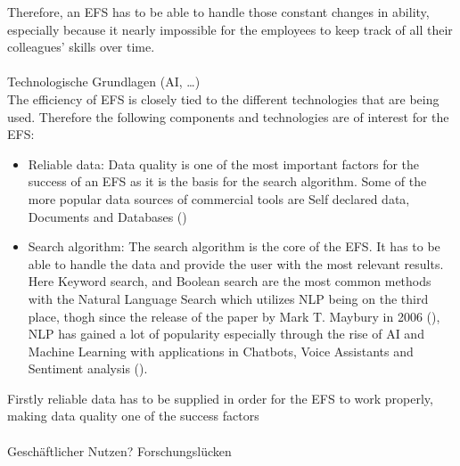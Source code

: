 Therefore, an \ac{EFS} has to be able to handle those constant changes in ability, especially because it nearly impossible for the employees to keep track of all their 
colleagues’ skills over time.
\\ \\
Technologische Grundlagen (AI, …)\\
The efficiency of \ac{EFS} is closely tied to the different technologies that are being used. Therefore the following components and technologies are of interest for the \ac{EFS}:
\begin{itemize}
    \item Reliable data: Data quality is one of the most important factors for the success of an \ac{EFS} as it is the basis for the search algorithm. Some of the
    more popular data sources of commercial tools are Self declared data, Documents and Databases (\cite[page 18]{maybury_expert_2006})
    \item Search algorithm: The search algorithm is the core of the \ac{EFS}. It has to be able to handle the data and provide the user with the most relevant 
    results. Here Keyword search, and Boolean search are the most common methods with the Natural Language Search which utilizes \ac{NLP} being on the third place,
    thogh since the release of the paper by Mark T. Maybury in 2006 (\cite[page 18]{maybury_expert_2006}), \ac{NLP} has gained a lot of popularity especially 
    through the rise of \ac{AI} and Machine Learning with applications in Chatbots, Voice Assistants and Sentiment analysis (\cite{administrator_role_2023}).
\end{itemize}

 Firstly reliable data has to be supplied in order for the \ac{EFS} to work 
properly, making data quality one of the success factors
\\ \\
Geschäftlicher Nutzen?
Forschungslücken


